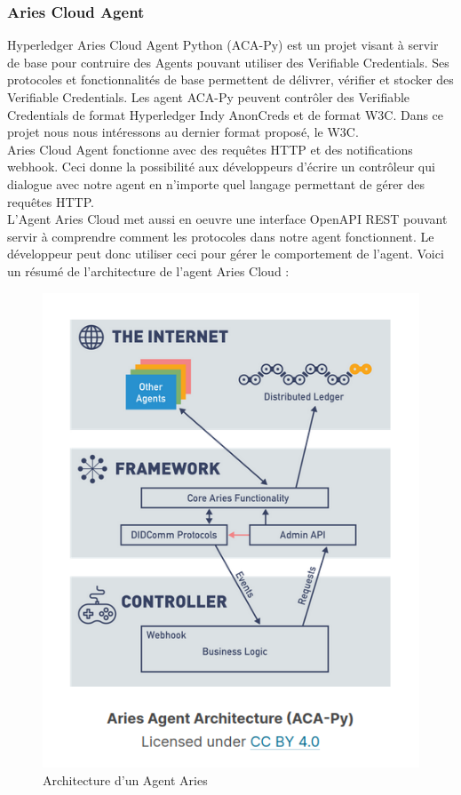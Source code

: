 \documentclass[12pt, openany]{report}
\begin{document}
\subsubsection{Aries Cloud Agent}
\noindent 
\begin{flushleft}
Hyperledger Aries Cloud Agent Python (ACA-Py) est un projet visant à servir de base pour contruire des Agents pouvant utiliser des Verifiable Credentials. Ses protocoles et fonctionnalités de base permettent de délivrer, vérifier et stocker des Verifiable Credentials. Les agent ACA-Py peuvent contrôler des Verifiable Credentials de format Hyperledger Indy AnonCreds et de format W3C. Dans ce projet nous nous intéressons au dernier format proposé, le W3C. \\
Aries Cloud Agent fonctionne avec des requêtes HTTP et des notifications webhook. Ceci donne la possibilité aux développeurs d'écrire un contrôleur qui dialogue avec notre agent en n'importe quel langage permettant de gérer des requêtes HTTP.\\
L'Agent Aries Cloud met aussi en oeuvre une interface OpenAPI REST pouvant servir à comprendre comment les protocoles dans notre agent fonctionnent. Le développeur peut donc utiliser ceci pour gérer le comportement de l'agent. Voici un résumé de l'architecture de l'agent Aries Cloud : \\

\begin{figure}[h]
\includegraphics[scale=0.5]{ACA-py.png}
\centering
\caption{Architecture d'un Agent Aries}
\end{figure}
\end{flushleft}
\end{document}

